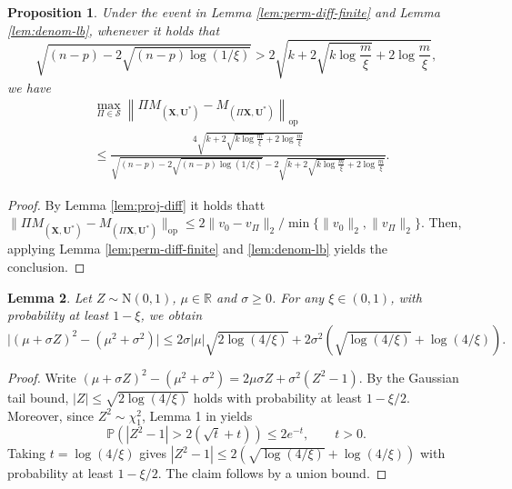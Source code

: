 \documentclass[11pt, reqno]{amsart}
\newcommand{\bP}{\mathbb{P}}
\renewcommand{\le}{\leqslant}
\renewcommand{\ge}{\geqslant}
\newcommand{\mS}{\mathcal{S}}
\newcommand{\1}{\mbox{1}\hspace{-0.25em}\mbox{l}}
\newcommand{\Normal}{\mathrm{N}}
\theoremstyle{definition}\newtheorem{problem}{Problem}[section]
\theoremstyle{definition}\newtheorem{definition}[problem]{Definition}
\theoremstyle{remark}\newtheorem{assumption}{Assumption}
\theoremstyle{remark}\newtheorem{remark}[problem]{Remark}
\theoremstyle{definition}\newtheorem{example}[problem]{Example}
\theoremstyle{plain}\newtheorem{theorem}[problem]{Theorem}
\theoremstyle{plain}\newtheorem{question}[problem]{Question}
\theoremstyle{plain}\newtheorem{lemma}[problem]{Lemma}
\theoremstyle{plain}\newtheorem{proposition}[problem]{Proposition}
\theoremstyle{plain}\newtheorem{corollary}[problem]{Corollary}
\theoremstyle{plain}\newtheorem{conjecture}[problem]{Conjecture}
\begin{document}
\begin{proposition}\label{prop:finite-path-op}
Under the event in Lemma \ref{lem:perm-diff-finite} and Lemma \ref{lem:denom-lb}, whenever it holds that
\begin{equation}\label{eq:positivity-path}
\sqrt{ (n-p)-2\sqrt{(n-p)\log(1/\xi)}} >2\sqrt{k+2\sqrt{k\log\frac{m}{\xi}  }+2\log\frac{m}{\xi}},
\end{equation}
we have
\begin{align*}\label{eq:op-bound-finite}
& \max_{\Pi\in\mS} \left\|\Pi M_{(\bm X,\bm U^*)}-M_{(\Pi\bm X,\bm U^*)}\right\|_{\mathrm{op}}
 \\ & \le
\frac{4\sqrt{k+2\sqrt{k\log\frac{m}{\xi}}+2\log\frac{m}{\xi}}}{\sqrt{ (n-p)-2\sqrt{(n-p)\log(1/\xi)}}-2\sqrt{k+2\sqrt{k\log\frac{m}{\xi}}+2\log\frac{m}{\xi}}}.
\end{align*}
\end{proposition}

\begin{proof}
By Lemma \ref{lem:proj-diff} it holds thatt
$
\|\Pi M_{(\bm X,\bm U^*)}-M_{(\Pi\bm X,\bm U^*)}\|_{\mathrm{op}}
\le 2\|v_0-v_\Pi\|_2/\min\{\|v_0\|_2,\|v_\Pi\|_2\}.
$
Then, applying Lemma \ref{lem:perm-diff-finite} and \ref{lem:denom-lb} yields the conclusion.

\end{proof}


\begin{lemma}\label{lem:poly-tail-finite}
Let $Z\sim\Normal(0,1)$, $\mu\in\mathbb R$ and $\sigma\ge 0$. For any $\xi\in(0,1)$,
with probability at least $1-\xi$, we obtain
\[
\big|(\mu+\sigma Z)^2-(\mu^2+\sigma^2)\big|
\le 2\sigma|\mu|\sqrt{2\log(4/\xi)}+2\sigma^2\left(\sqrt{\log(4/\xi)}+\log(4/\xi)\right).
\]
\end{lemma}

\begin{proof}
Write $(\mu+\sigma Z)^2-(\mu^2+\sigma^2)=2\mu\sigma Z+\sigma^2(Z^2-1)$. By the Gaussian tail bound,
$|Z|\le \sqrt{2\log(4/\xi)}$ holds with probability at least $1-\xi/2$.
Moreover, since $Z^2\sim\chi^2_1$, Lemma 1 in  \cite{laurent2000adaptive} yields
\[
\bP\left(|Z^2-1|>2(\sqrt{t}+t)\right)\le 2e^{-t},\qquad t>0.
\]
Taking $t=\log(4/\xi)$ gives $|Z^2-1|\le 2(\sqrt{\log(4/\xi)}+\log(4/\xi))$ with probability at least $1-\xi/2$.
The claim follows by a union bound.
\end{proof}
\end{document}
